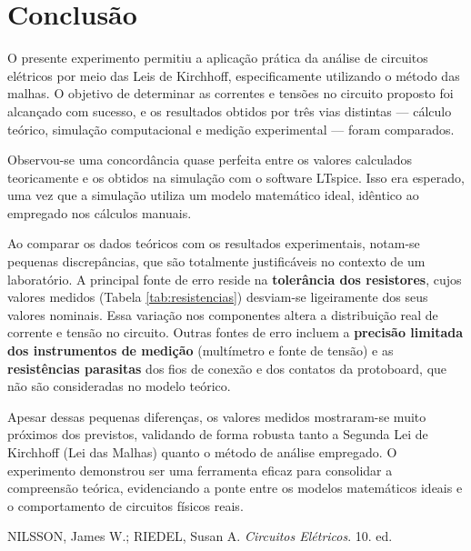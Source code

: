 \documentclass[a4paper, 12pt]{article}
\begin{document}
\section{Conclusão}

O presente experimento permitiu a aplicação prática da análise de circuitos elétricos por meio das Leis de Kirchhoff, especificamente utilizando o método das malhas. O objetivo de determinar as correntes e tensões no circuito proposto foi alcançado com sucesso, e os resultados obtidos por três vias distintas — cálculo teórico, simulação computacional e medição experimental — foram comparados.

Observou-se uma concordância quase perfeita entre os valores calculados teoricamente e os obtidos na simulação com o software LTspice. Isso era esperado, uma vez que a simulação utiliza um modelo matemático ideal, idêntico ao empregado nos cálculos manuais.

Ao comparar os dados teóricos com os resultados experimentais, notam-se pequenas discrepâncias, que são totalmente justificáveis no contexto de um laboratório. A principal fonte de erro reside na \textbf{tolerância dos resistores}, cujos valores medidos (Tabela \ref{tab:resistencias}) desviam-se ligeiramente dos seus valores nominais. Essa variação nos componentes altera a distribuição real de corrente e tensão no circuito. Outras fontes de erro incluem a \textbf{precisão limitada dos instrumentos de medição} (multímetro e fonte de tensão) e as \textbf{resistências parasitas} dos fios de conexão e dos contatos da protoboard, que não são consideradas no modelo teórico.

Apesar dessas pequenas diferenças, os valores medidos mostraram-se muito próximos dos previstos, validando de forma robusta tanto a Segunda Lei de Kirchhoff (Lei das Malhas) quanto o método de análise empregado. O experimento demonstrou ser uma ferramenta eficaz para consolidar a compreensão teórica, evidenciando a ponte entre os modelos matemáticos ideais e o comportamento de circuitos físicos reais.


\begin{thebibliography}{9}

NILSSON, James W.; RIEDEL, Susan A. \textit{Circuitos Elétricos}. 10. ed.
\end{thebibliography}
\end{document}
